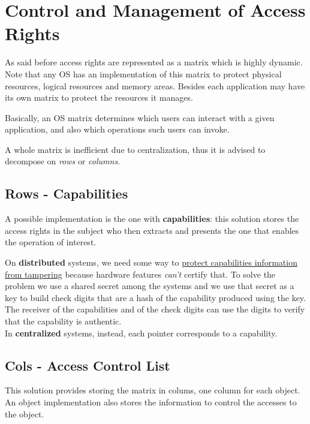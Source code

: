 \section{Control and Management of Access Rights}
As said before access rights are represented as a matrix which is highly dynamic.\\
Note that any OS has an implementation of this matrix to protect physical resources, logical resources and memory areas.
Besides each application may have its own matrix to protect the resources it manages.

Basically, an OS matrix determines which users can interact with a given application,
and also which operations such users can invoke.

A whole matrix is inefficient due to centralization, thus it is advised to decompose on \textit{rows} or \textit{columns}.

\subsection{Rows - Capabilities}
A possible implementation is the one with \textbf{capabilities}: this solution stores the access rights in the
subject who then extracts and presents the one that enables the operation of interest.

On \textbf{distributed} systems, we need some way to \ul{protect capabilities information from tampering} because hardware features \textit{can’t} certify that.
To solve the problem we use a shared secret among the systems and we use that secret as a key to build check digits that are a hash of the capability
produced using the key.
The receiver of the capabilities and of the check digits can use the digits to verify that the capability is authentic.\\
In \textbf{centralized} systems, instead, each pointer corresponds to a capability.

\subsection{Cols - Access Control List}
This solution provides storing the matrix in colums, one column for each object.
An object implementation also stores the information to control the accesses to the object.

